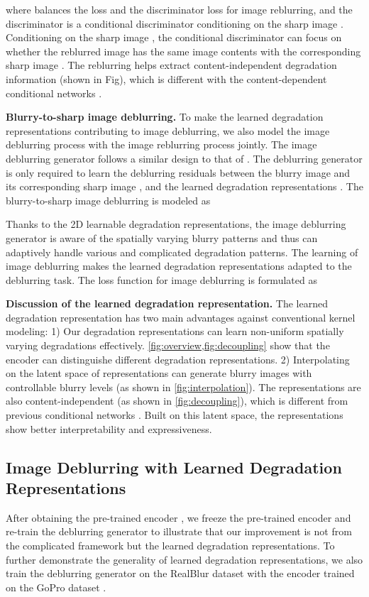\documentclass[runningheads]{llncs}
\begin{document}
where  balances the  loss and the discriminator loss for image reblurring, and the discriminator  is a conditional discriminator conditioning on the sharp image . 
Conditioning on the sharp image , the conditional discriminator  can focus on whether the reblurred image  has the same image contents with the corresponding sharp image . 
The reblurring helps extract content-independent degradation information (shown in Fig), which is different with the content-dependent conditional networks \cite{wang2018sftgan,spatially_variant_recurrent,zhou2019stfan}.


\noindent\textbf{Blurry-to-sharp image deblurring.} To make the learned degradation representations contributing to image deblurring, we also model the image deblurring process with the image reblurring process jointly. 
The image deblurring generator  follows a similar design to that of . The deblurring generator  is only required to learn the deblurring residuals between the blurry image  and its corresponding sharp image , and the learned degradation representations . The blurry-to-sharp image deblurring is modeled as

Thanks to the 2D learnable degradation representations, the image deblurring generator  is aware of the spatially varying blurry patterns and thus can adaptively handle various and complicated degradation patterns. The learning of image deblurring makes the learned degradation representations adapted to the deblurring task. The loss function for image deblurring is formulated as

\noindent\textbf{Discussion of the learned degradation representation.}
The learned degradation representation has two main advantages against conventional kernel modeling: 1) Our degradation representations can learn non-uniform spatially varying degradations effectively. 
\cref{fig:overview,fig:decoupling} show that the encoder can distinguishe different degradation representations. 
2) Interpolating on the latent space of representations can generate blurry images with controllable blurry levels (as shown in \cref{fig:interpolation}). The representations are also content-independent (as shown in \cref{fig:decoupling}), which is different from previous conditional networks \cite{wang2018sftgan,spatially_variant_recurrent,zhou2019stfan}. Built on this latent space, the representations show better interpretability and expressiveness.

\subsection{Image Deblurring with Learned Degradation Representations}
After obtaining the pre-trained encoder , we freeze the pre-trained encoder and re-train the deblurring generator  to illustrate that our improvement is not from the complicated framework but the learned degradation representations. To further demonstrate the generality of learned degradation representations, we also train the deblurring generator  on the RealBlur dataset \cite{realblur} with the encoder trained on the GoPro dataset \cite{deblur-multi-scale}.
\end{document}
